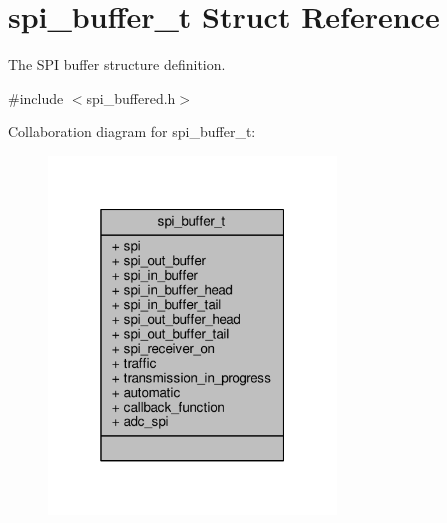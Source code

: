 \hypertarget{structspi__buffer__t}{\section{spi\+\_\+buffer\+\_\+t Struct Reference}
\label{structspi__buffer__t}
}


The S\+P\+I buffer structure definition.  




{\ttfamily \#include $<$spi\+\_\+buffered.\+h$>$}



Collaboration diagram for spi\+\_\+buffer\+\_\+t\+:
\nopagebreak
\begin{figure}[H]
\begin{center}
\leavevmode
\includegraphics[width=217pt]{structspi__buffer__t__coll__graph}
\end{center}
\end{figure}
